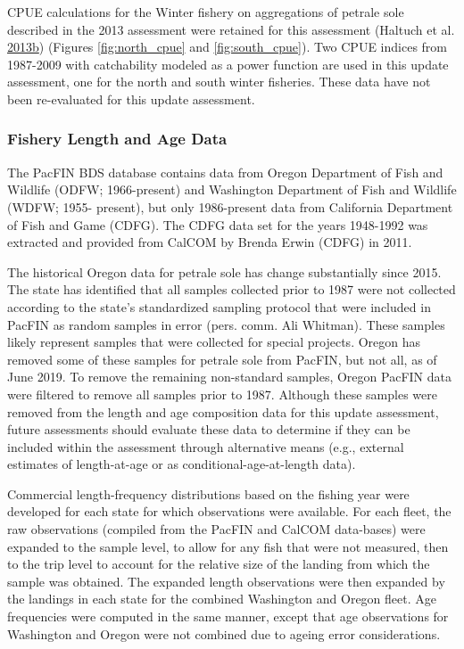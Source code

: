 \documentclass[12pt,]{article}
\begin{document}
CPUE calculations for the Winter fishery on aggregations of petrale sole
described in the 2013 assessment were retained for this assessment
(Haltuch et al.
\protect\hyperlink{ref-haltuch_status_2013}{2013}\protect\hyperlink{ref-haltuch_status_2013}{b})
(Figures \ref{fig:north_cpue} and \ref{fig:south_cpue}). Two CPUE
indices from 1987-2009 with catchability modeled as a power function are
used in this update assessment, one for the north and south winter
fisheries. These data have not been re-evaluated for this update
assessment.

\subsubsection{Fishery Length and Age
Data}\label{fishery-length-and-age-data}

The PacFIN BDS database contains data from Oregon Department of Fish and
Wildlife (ODFW; 1966-present) and Washington Department of Fish and
Wildlife (WDFW; 1955- present), but only 1986-present data from
California Department of Fish and Game (CDFG). The CDFG data set for the
years 1948-1992 was extracted and provided from CalCOM by Brenda Erwin
(CDFG) in 2011.

The historical Oregon data for petrale sole has change substantially
since 2015. The state has identified that all samples collected prior to
1987 were not collected according to the state's standardized sampling
protocol that were included in PacFIN as random samples in error (pers.
comm. Ali Whitman). These samples likely represent samples that were
collected for special projects. Oregon has removed some of these samples
for petrale sole from PacFIN, but not all, as of June 2019. To remove
the remaining non-standard samples, Oregon PacFIN data were filtered to
remove all samples prior to 1987. Although these samples were removed
from the length and age composition data for this update assessment,
future assessments should evaluate these data to determine if they can
be included within the assessment through alternative means (e.g.,
external estimates of length-at-age or as conditional-age-at-length
data).

Commercial length-frequency distributions based on the fishing year were
developed for each state for which observations were available. For each
fleet, the raw observations (compiled from the PacFIN and CalCOM
data-bases) were expanded to the sample level, to allow for any fish
that were not measured, then to the trip level to account for the
relative size of the landing from which the sample was obtained. The
expanded length observations were then expanded by the landings in each
state for the combined Washington and Oregon fleet. Age frequencies were
computed in the same manner, except that age observations for Washington
and Oregon were not combined due to ageing error considerations.
\end{document}
